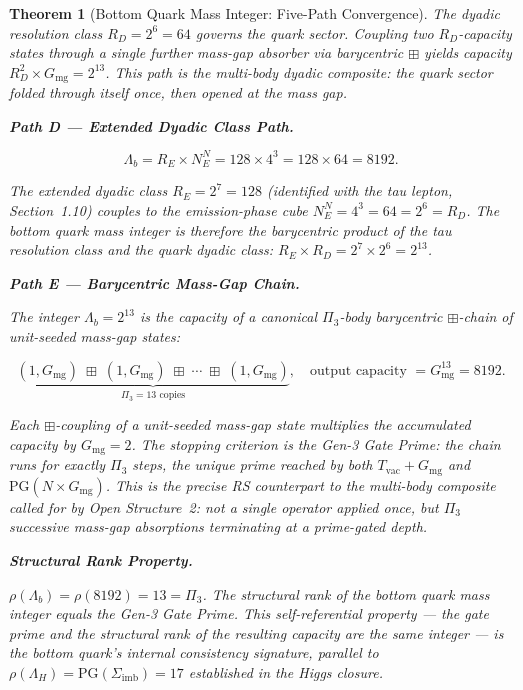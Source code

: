 \documentclass[11pt, letterpaper]{article}
\theoremstyle{definition}
\theoremstyle{plain}
\newtheorem{theorem}{Theorem}[section]
\begin{document}
\begin{theorem}[Bottom Quark Mass Integer: Five-Path Convergence]
The dyadic resolution class $R_D = 2^6 = 64$ governs the quark sector. Coupling two
$R_D$-capacity states through a single further mass-gap absorber via barycentric
$\boxplus$ yields capacity $R_D^2 \times G_\mathrm{mg} = 2^{13}$. This path is the
multi-body dyadic composite: the quark sector folded through itself once, then opened
at the mass gap.

\medskip
\noindent\textbf{Path D — Extended Dyadic Class Path.}

\begin{equation}
    \Lambda_b = R_E \times N_E^N = 128 \times 4^3 = 128 \times 64 = 8192.
\end{equation}

The extended dyadic class $R_E = 2^7 = 128$ (identified with the tau lepton, Section~1.10)
couples to the emission-phase cube $N_E^N = 4^3 = 64 = 2^6 = R_D$. The bottom quark mass
integer is therefore the barycentric product of the tau resolution class and the
quark dyadic class: $R_E \times R_D = 2^7 \times 2^6 = 2^{13}$.

\medskip
\noindent\textbf{Path E — Barycentric Mass-Gap Chain.}

The integer $\Lambda_b = 2^{13}$ is the capacity of a canonical $\Pi_3$-body barycentric
$\boxplus$-chain of unit-seeded mass-gap states:

\begin{equation}
    \underbrace{(1, G_\mathrm{mg}) \;\boxplus\; (1, G_\mathrm{mg}) \;\boxplus\;
    \cdots \;\boxplus\; (1, G_\mathrm{mg})}_{\Pi_3 = 13 \text{ copies}},
    \quad \text{output capacity } = G_\mathrm{mg}^{13} = 8192.
\end{equation}

Each $\boxplus$-coupling of a unit-seeded mass-gap state multiplies the accumulated
capacity by $G_\mathrm{mg} = 2$. The stopping criterion is the Gen-3 Gate Prime:
the chain runs for exactly $\Pi_3$ steps, the unique prime reached by both
$T_\mathrm{vac} + G_\mathrm{mg}$ and $\mathrm{PG}(N \times G_\mathrm{mg})$.
This is the precise RS counterpart to the multi-body composite called for by
Open Structure~2: not a single operator applied once, but $\Pi_3$ successive
mass-gap absorptions terminating at a prime-gated depth.

\medskip
\noindent\textbf{Structural Rank Property.}

$\rho(\Lambda_b) = \rho(8192) = 13 = \Pi_3$.
The structural rank of the bottom quark mass integer equals the Gen-3 Gate Prime.
This self-referential property — the gate prime and the structural rank of the
resulting capacity are the same integer — is the bottom quark's internal consistency
signature, parallel to $\rho(\Lambda_H) = \mathrm{PG}(\Sigma_\mathrm{imb}) = 17$
established in the Higgs closure.
\end{theorem}
\end{document}
